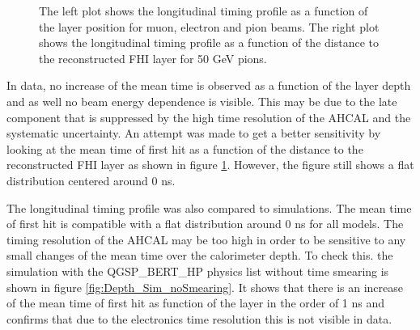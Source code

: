 \begin{figure}[htbp!]
\begin{subfigure}[t]{0.49\textwidth}
		\caption{}\label{fig:Depth_Comparison_FHI}
	\end{subfigure}
	\caption{The left plot shows the longitudinal timing profile as a function of the layer position for muon, electron and pion beams. The right plot shows the longitudinal timing profile as a function of the distance to the reconstructed FHI layer for 50 GeV pions.}
	\label{fig:DepthProfile}
\end{figure}

In data, no increase of the mean time is observed as a function of the layer depth and as well no beam energy dependence is visible. This may be due to the late component that is suppressed by the high time resolution of the AHCAL and the systematic uncertainty. An attempt was made to get a better sensitivity by looking at the mean time of first hit as a function of the distance to the reconstructed FHI layer as shown in figure \ref{fig:Depth_Comparison_FHI}. However, the figure still shows a flat distribution centered around 0 ns.

The longitudinal timing profile was also compared to simulations. The mean time of first hit is compatible with a flat distribution around 0 ns for all models. The timing resolution of the AHCAL may be too high in order to be sensitive to any small changes of the mean time over the calorimeter depth. To check this. the simulation with the QGSP\_BERT\_HP physics list without time smearing is shown in figure \ref{fig:Depth_Sim_noSmearing}. It shows that there is an increase of the mean time of first hit as function of the layer in the order of 1 ns and confirms that due to the electronics time resolution this is not visible in data.

